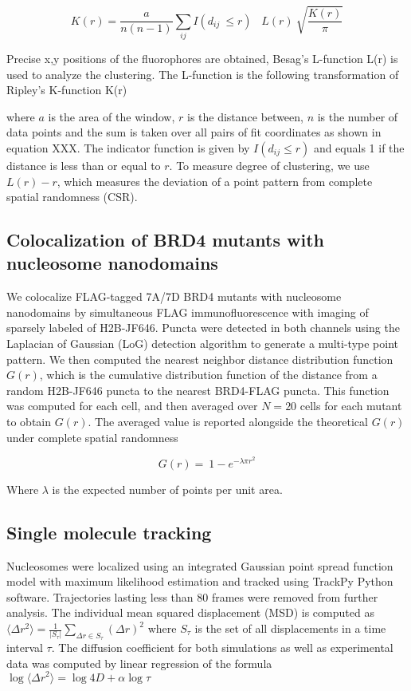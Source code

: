 \begin{equation*}
K(r) =\frac{a}{n(n-1)}\sum_{ij}{I(d_{ij}\ \le r)}\;\;\; L(r)\ \sqrt{\frac{K(r)}{\pi}}
\end{equation*}

Precise x,y positions of the fluorophores are obtained, Besag’s L-function L(r) is used to analyze the clustering. The L-function is the following transformation of Ripley’s K-function K(r) 


where $a$ is the area of the window, $r$ is the distance between, $n$ is the number of data points and the sum is taken over all pairs of fit coordinates as shown in equation XXX. The indicator function is given by $I(d_{ij}\le r)$ and equals 1 if the distance is less than or equal to $r$. To measure degree of clustering, we use $L(r)-r$, which measures the deviation of a point pattern from complete spatial randomness (CSR). 

\subsection{Colocalization of BRD4 mutants with nucleosome nanodomains}

We colocalize FLAG-tagged 7A/7D BRD4 mutants with nucleosome nanodomains by simultaneous FLAG immunofluorescence with imaging of sparsely labeled of H2B-JF646. Puncta were detected in both channels using the Laplacian of Gaussian (LoG) detection algorithm to generate a multi-type point pattern. We then computed the nearest neighbor distance distribution function $G(r)$, which is the cumulative distribution function of the distance from a random H2B-JF646 puncta to the nearest BRD4-FLAG puncta. This function was computed for each cell, and then averaged over $N=20$ cells for each mutant to obtain $G(r)$. The averaged value is reported alongside the theoretical $G(r)$ under complete spatial randomness

\begin{equation*}
G(r)=\ 1-e^{-\lambda\pi r^2}
\end{equation*}

Where $\lambda$ is the expected number of points per unit area. 

\subsection{Single molecule tracking}

Nucleosomes were localized using an integrated Gaussian point spread function model with maximum likelihood estimation \parencite{Smith2010,Huang2013} and tracked using TrackPy Python software.  Trajectories lasting less than 80 frames were removed from further analysis. The individual mean squared displacement (MSD) is computed as $\langle \Delta r^{2}\rangle = \frac{1}{\lvert S_{\tau}\lvert}\sum_{\Delta r \in S_{\tau}}(\Delta r)^{2}$
where $S_\tau$ is the set of all displacements in a time interval $\tau$. The diffusion coefficient for both simulations as well as experimental data was computed by linear regression of the formula $\log\langle \Delta r^{2}\rangle  = \log 4D + \alpha \log \tau$


